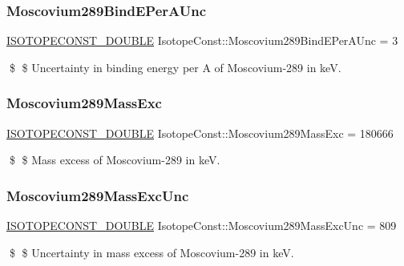\subsubsection{\texorpdfstring{Moscovium289\+Bind\+E\+Per\+A\+Unc}{Moscovium289BindEPerAUnc}}
{\footnotesize\ttfamily \mbox{\hyperlink{group___isotope_const-_macros_ga8f45a7272ce02c0b4c65c44636ed719a}{I\+S\+O\+T\+O\+P\+E\+C\+O\+N\+S\+T\+\_\+\+D\+O\+U\+B\+LE}} Isotope\+Const\+::\+Moscovium289\+Bind\+E\+Per\+A\+Unc = 3}

\$ \$ Uncertainty in binding energy per A of Moscovium-\/289 in keV. \mbox{\label{group___isotope_const-_moscovium-_mc289_ga71dd06141646c9cfd76c075c08191e6b}} 
\subsubsection{\texorpdfstring{Moscovium289\+Mass\+Exc}{Moscovium289MassExc}}
{\footnotesize\ttfamily \mbox{\hyperlink{group___isotope_const-_macros_ga8f45a7272ce02c0b4c65c44636ed719a}{I\+S\+O\+T\+O\+P\+E\+C\+O\+N\+S\+T\+\_\+\+D\+O\+U\+B\+LE}} Isotope\+Const\+::\+Moscovium289\+Mass\+Exc = 180666}

\$ \$ Mass excess of Moscovium-\/289 in keV. \mbox{\label{group___isotope_const-_moscovium-_mc289_gad0b6ef829c52885bc2ee0aabbf443642}} 
\subsubsection{\texorpdfstring{Moscovium289\+Mass\+Exc\+Unc}{Moscovium289MassExcUnc}}
{\footnotesize\ttfamily \mbox{\hyperlink{group___isotope_const-_macros_ga8f45a7272ce02c0b4c65c44636ed719a}{I\+S\+O\+T\+O\+P\+E\+C\+O\+N\+S\+T\+\_\+\+D\+O\+U\+B\+LE}} Isotope\+Const\+::\+Moscovium289\+Mass\+Exc\+Unc = 809}

\$ \$ Uncertainty in mass excess of Moscovium-\/289 in keV. \mbox{\label{group___isotope_const-_moscovium-_mc289_gaec9622dfd071a0acdab7cbf10e1e957f}} 
